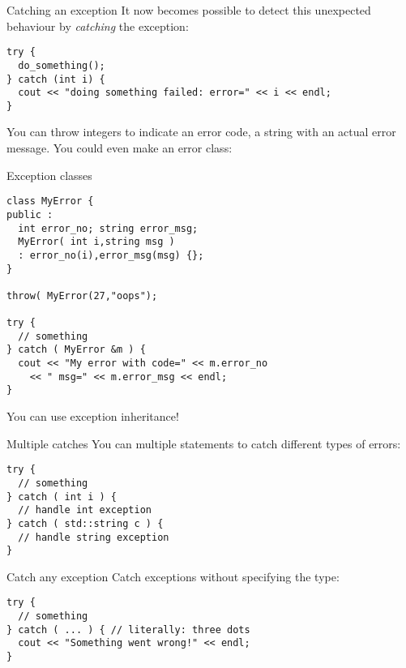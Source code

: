 \begin{block}{Catching an exception}
  \label{sl:exception-catch}
  It now becomes possible to detect this unexpected behaviour by
  \emph{catching}
  the exception:
\begin{lstlisting}
try {
  do_something();
} catch (int i) {
  cout << "doing something failed: error=" << i << endl;
}
\end{lstlisting}
\end{block}

You can throw integers to indicate an error code, a string with an
actual error message. You could even make an error class:

\begin{block}{Exception classes}
  \label{sl:exception-class}
\begin{lstlisting}
class MyError {
public :
  int error_no; string error_msg;
  MyError( int i,string msg )
  : error_no(i),error_msg(msg) {};
}

throw( MyError(27,"oops");

try {
  // something
} catch ( MyError &m ) {
  cout << "My error with code=" << m.error_no
    << " msg=" << m.error_msg << endl;
}
\end{lstlisting}
You can use exception inheritance!
\end{block}

\begin{block}{Multiple catches}
  \label{sl:exception-catches}
  You can multiple  statements to catch different types of
  errors:
\begin{lstlisting}
try {
  // something
} catch ( int i ) {
  // handle int exception
} catch ( std::string c ) {
  // handle string exception
}
\end{lstlisting}
\end{block}

\begin{block}{Catch any exception}
  \label{sl:exception-catchall}
  Catch exceptions without specifying the type:
\begin{lstlisting}
try {
  // something
} catch ( ... ) { // literally: three dots
  cout << "Something went wrong!" << endl;
}
\end{lstlisting}
\end{block}

